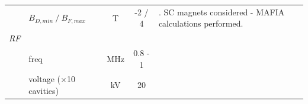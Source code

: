 \documentclass[12pt]{article}
\begin{document}
{{\begin{tabular}{llccl}
&  $B_{D,min} ~/~ B_{F,max}$  &  T &  -2 / 4         & . SC magnets considered - MAFIA calculations performed.   \\
\it\large  RF              &        &  \\
&      freq      &    MHz &       0.8 - 1              &             \\
&   voltage ($\times$10 cavities)&   kV  &        20                &    \\
\end{tabular}
}





}







\clearpage 
\end{document}
